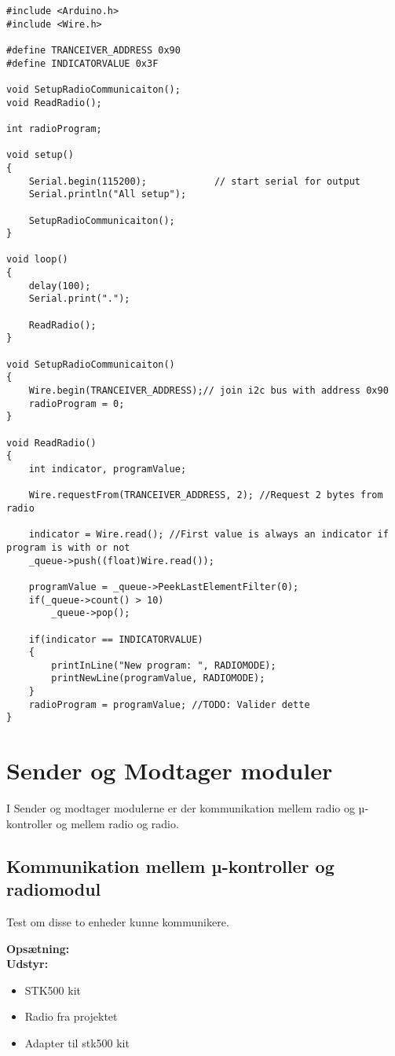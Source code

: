 \documentclass[Main]{subfiles}
\begin{document}
\begin{lstlisting}[caption=title, style=Code-C, label=lst:itocLEs]
#include <Arduino.h>
#include <Wire.h>

#define TRANCEIVER_ADDRESS 0x90
#define INDICATORVALUE 0x3F

void SetupRadioCommunicaiton();
void ReadRadio();

int radioProgram;

void setup()
{
	Serial.begin(115200);            // start serial for output
	Serial.println("All setup");

	SetupRadioCommunicaiton();
}

void loop()
{
	delay(100);
	Serial.print(".");
	
	ReadRadio();
}

void SetupRadioCommunicaiton()
{
	Wire.begin(TRANCEIVER_ADDRESS);// join i2c bus with address 0x90
	radioProgram = 0;
}

void ReadRadio()
{
	int indicator, programValue;

	Wire.requestFrom(TRANCEIVER_ADDRESS, 2); //Request 2 bytes from radio

	indicator = Wire.read(); //First value is always an indicator if program is with or not
	_queue->push((float)Wire.read());

	programValue = _queue->PeekLastElementFilter(0);
	if(_queue->count() > 10)
		_queue->pop();

	if(indicator == INDICATORVALUE)
	{
		printInLine("New program: ", RADIOMODE);
		printNewLine(programValue, RADIOMODE);
	}
	radioProgram = programValue; //TODO: Valider dette
}
\end{lstlisting}

\section{Sender og Modtager moduler}
I Sender og modtager modulerne er der kommunikation mellem radio og µ-kontroller og mellem radio og radio.

\newpage
\subsection{Kommunikation mellem µ-kontroller og radiomodul}
Test om disse to enheder kunne kommunikere.


\textbf{Opsætning:}\\
\textbf{Udstyr:}
\begin{itemize}
\item STK500 kit
\item Radio fra projektet
\item Adapter til stk500 kit
\end{itemize}
\end{document}
